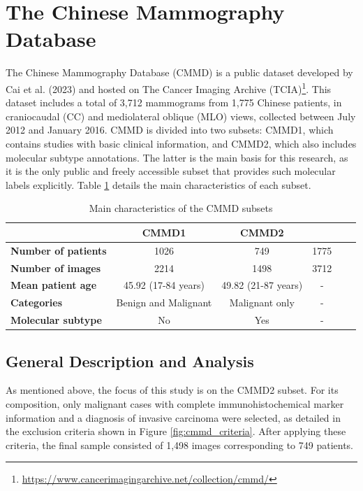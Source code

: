 \documentclass[a4paper,10pt]{book}
\begin{document}
\section{The Chinese Mammography Database}

The Chinese Mammography Database (CMMD) is a public dataset developed by Cai et al. (2023) \cite{cai_online_2023} and hosted on The Cancer Imaging Archive (TCIA)\footnote{\url{https://www.cancerimagingarchive.net/collection/cmmd/}}. This dataset includes a total of 3,712 mammograms from 1,775 Chinese patients, in craniocaudal (CC) and mediolateral oblique (MLO) views, collected between July 2012 and January 2016. CMMD is divided into two subsets: CMMD1, which contains studies with basic clinical information, and CMMD2, which also includes molecular subtype annotations. The latter is the main basis for this research, as it is the only public and freely accessible subset that provides such molecular labels explicitly. Table \ref{tab:cmmd_features} details the main characteristics of each subset.

\begin{table}
        \caption{Main characteristics of the CMMD subsets}
	\centering
	\begin{tabular}{lccccc}
		\toprule
		                            & \textbf{CMMD1}       & \textbf{CMMD2}      &      \\
		\midrule
		\textbf{Number of patients} & 1026                 & 749                 & 1775 \\
		\textbf{Number of images}   & 2214                 & 1498                & 3712 \\
		\textbf{Mean patient age}   & 45.92 (17-84 years)  & 49.82 (21-87 years) & -    \\
		\textbf{Categories}         & Benign and Malignant & Malignant only      & -    \\
		\textbf{Molecular subtype}  & No                   & Yes                 & -    \\
		\bottomrule
	\end{tabular}
	\label{tab:cmmd_features}
\end{table}


\subsection{General Description and Analysis}

As mentioned above, the focus of this study is on the CMMD2 subset. For its composition, only malignant cases with complete immunohistochemical marker information and a diagnosis of invasive carcinoma were selected, as detailed in the exclusion criteria shown in Figure \ref{fig:cmmd_criteria}. After applying these criteria, the final sample consisted of 1,498 images corresponding to 749 patients.
\end{document}
